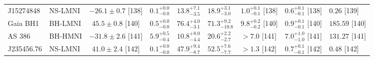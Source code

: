 \begin{table*}
\begin{adjustbox}{width=0.98\textwidth}
\begin{threeparttable}
\begin{tabular}{llcllllll}
      J15274848            & NS-LMNI  & $ -26.1\pm  0.7$ [138] & $0.1^{+0.0}_{-0.0}$         & $13.8^{+7.1}_{-3.5}$      & $18.9^{+3.1}_{-3.0}$      & $1.0^{+0.1}_{-0.1}$ [138] & $0.6^{+0.1}_{-0.1}$ [138]    & $0.26$ [139] \\
      Gaia BH1             & BH-LMNI  & $  45.5\pm  0.8$ [140] & $0.5^{+0.0}_{-0.0}$         & $76.4^{+4.0}_{-3.1}$      & $71.3^{+9.2}_{-10.8}$     & $9.8^{+0.2}_{-0.2}$ [140] & $0.9^{+0.1}_{-0.1}$ [140]    & $185.59$ [140] \\
      AS 386               & BH-HMNI  & $ -31.8\pm  2.6$ [141] & $5.9^{+0.5}_{-0.4}$         & $10.8^{+8.0}_{-4.4}$      & $20.6^{+2.2}_{-2.7}$      & $>7.0$ [141]              & $7.0^{+1.0}_{-1.0}$ [141]    & $131.27$ [141] \\
      J235456.76           & NS-LMNI  & $  41.0\pm  2.4$ [142] & $0.1^{+0.0}_{-0.0}$         & $47.9^{+9.4}_{-8.7}$      & $52.5^{+7.6}_{-7.7}$      & $>1.3$ [142]              & $0.7^{+0.1}_{-0.1}$ [142]    & $0.48$ [142] \\
          \bottomrule
      \end{tabular}
      \begin{tablenotes}

\end{tablenotes}
\end{threeparttable}
\end{adjustbox}
\end{table*}

